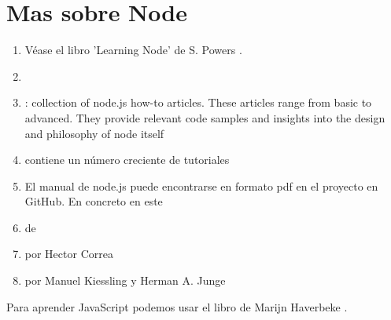 \section{Mas sobre Node}
\begin{enumerate}
\item
Véase el libro 'Learning Node' de S. Powers \cite{learningnode}.
\item {}
\item {}: collection of node.js how-to articles. These articles range from basic to advanced. They provide relevant code samples and insights into the design and philosophy of node itself

\item {}
contiene un número creciente de tutoriales
\item El manual de node.js puede encontrarse en formato pdf en el proyecto 
en GitHub. En concreto en este 
\item {} de
\item {} por Hector Correa
\item {} por Manuel Kiessling  y Herman A. Junge
\end{enumerate}
Para aprender JavaScript podemos usar el libro
 de Marijn Haverbeke \cite{eloquentjavascript}.


